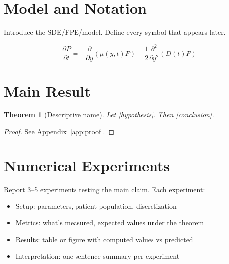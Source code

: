 \documentclass[11pt,a4paper]{article}
\theoremstyle{plain}
\newtheorem{theorem}{Theorem}
\theoremstyle{definition}
\begin{document}

\section{Model and Notation}
\label{sec:model}

Introduce the SDE/FPE/model. Define every symbol that appears later.

\begin{equation}
\frac{\partial P}{\partial t} = -\frac{\partial}{\partial y}(\mu(y,t) P) + \frac{1}{2}\frac{\partial^2}{\partial y^2}(D(t) P)
\label{eq:fpe}
\end{equation}


\section{Main Result}
\label{sec:main}

\begin{theorem}[Descriptive name]
\label{thm:main}
Let [hypothesis]. Then [conclusion].
\end{theorem}

\begin{proof}
See Appendix~\ref{app:proof}.
\end{proof}


\section{Numerical Experiments}
\label{sec:experiments}

Report 3--5 experiments testing the main claim. Each experiment:
\begin{itemize}
\item Setup: parameters, patient population, discretization
\item Metrics: what's measured, expected values under the theorem
\item Results: table or figure with computed values vs predicted
\item Interpretation: one sentence summary per experiment
\end{itemize}
\end{document}
